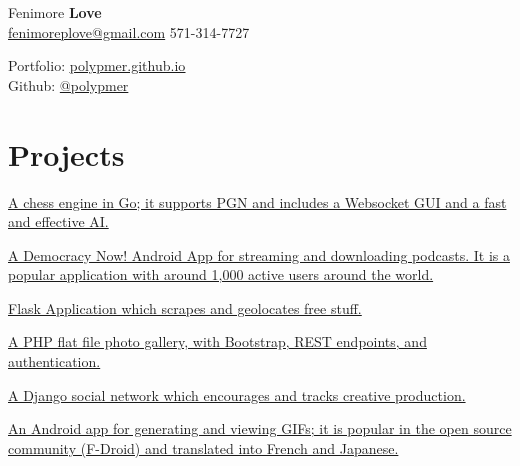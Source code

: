 \documentclass[]{deedy-resume-openfont}
\begin{document}
%
%

%
%
\begin{minipage}[t]{.6\textwidth}
{\Huge Fenimore {\textbf{Love}}}\\
\href{mailto:fenimoreplove@gmail.com}{fenimoreplove@gmail.com} \textbullet{} 571-314-7727\\
\end{minipage}
\hfill
\begin{minipage}[t]{.3\textwidth}
Portfolio: \underline{\href{https://polypmer.github.io}{polypmer.github.io}}\\
Github: \href{https://github.com/polypmer}{@polypmer}
\end{minipage}
\namesection{}{} %

\section{Projects}
\href{https://ghess-chess.herokuapp.com/}{A chess engine in Go; it supports PGN and includes a Websocket GUI and a fast and effective AI.}
\sectionsep

\href{https://play.google.com/store/apps/details?id=com.workingagenda.democracydroid}{A Democracy Now! Android App for streaming and downloading podcasts. It is a popular application with around 1,000 active users around the world.}
\sectionsep

\href{http://treasure.plyp.org}{ Flask Application which scrapes and geolocates free stuff.}
\sectionsep

\href{http://wink.plyp.org}{A PHP flat file photo gallery, with Bootstrap, REST endpoints, and authentication.}
\sectionsep

\href{http://realmess.plyp.org/}{A Django social network which encourages and tracks creative production.}
\sectionsep

\href{https://github.com/polypmer/fissure-android}{An Android app for generating and viewing GIFs; it is popular in the open source community (F-Droid) and translated into French and Japanese.}
\sectionsep
\end{document}
